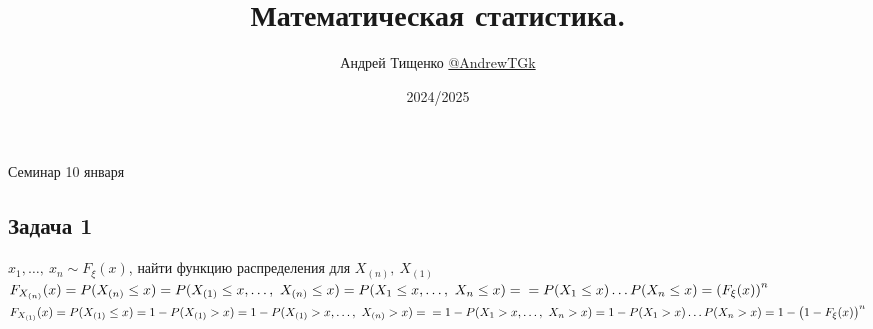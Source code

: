 \documentclass[12pt, a4paper]{article}
\title{Математическая статистика.}
\author{Андрей Тищенко \href{https://t.me/AndrewTGk}{@AndrewTGk}}
\date{2024/2025}
\begin{document}
\maketitle
\begin{center}
    Семинар 10 января
\end{center}
\subsection*{Задача 1}
$x_1,\dots,\ x_n\sim F_{\xi}(x)$, найти функцию распределения для $X_{(n)},\ X_{(1)}$\\
$F_{X_{(n)}}(x) = P(X_{(n)} \leq x) = P(X_{(1)} \leq x,\dots,\ X_{(n)} \leq x) = P(X_1 \leq x,\dots,\ X_n \leq x) =\\
    =P(X_1\leq x) \dots P(X_n \leq x) ={(F_{\xi}(x))}^{n}$\\
$F_{X_{(1)}}(x) = P(X_{(1)} \leq x) = 1 - P(X_{(1)} > x) = 1 - P(X_{(1)} > x,\dots,\ X_{(n)} > x) =\\
    = 1 - P(X_1 > x,\dots,\ X_n > x) = 1 - P(X_1 > x)\dots P(X_n > x) = 1 - {\big(1 - F_{\xi}(x)\big)}^n$
\end{document}

